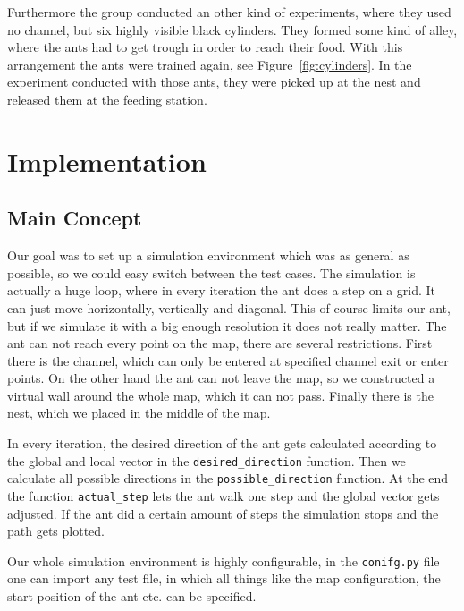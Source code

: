 \documentclass[11pt]{article}
\begin{document}
	Furthermore the group conducted an other kind of experiments, where they used no channel, but six highly visible black cylinders. They formed some kind of alley, where the ants had to get trough in order to reach their food. With this arrangement the ants were trained again, see Figure~\vref{fig:cylinders}. In the experiment conducted with those ants, they were picked up at the nest and released them at the feeding station.
		



\section{Implementation} %
	\subsection{Main Concept}
		Our goal was to set up a simulation environment which was as general as possible, so we could easy switch between the test cases. The simulation is actually a huge loop, where in every iteration the ant does a step on a grid. It can just move horizontally, vertically and diagonal. This of course limits our ant, but if we simulate it with a big enough resolution it does not really matter. The ant can not reach every point on the map, there are several restrictions. First there is the channel, which can only be entered at specified channel exit or enter points. On the other hand the ant can not leave the map, so we constructed a virtual wall around the whole map, which it can not pass. Finally there is the nest, which we placed in the middle of the map.

In every iteration, the desired direction of the ant gets calculated according to the global and local vector in the \texttt{desired\_direction} function. Then we calculate all possible directions in the \texttt{possible\_direction} function. At the end the function \texttt{actual\_step} lets the ant walk one step and the global vector gets adjusted. If the ant did a certain amount of steps the simulation stops and the path gets plotted.

Our whole simulation environment is highly configurable, in the \texttt{conifg.py} file one can import any test file, in which all things like the map configuration, the start position of the ant etc. can be specified.
\end{document}
